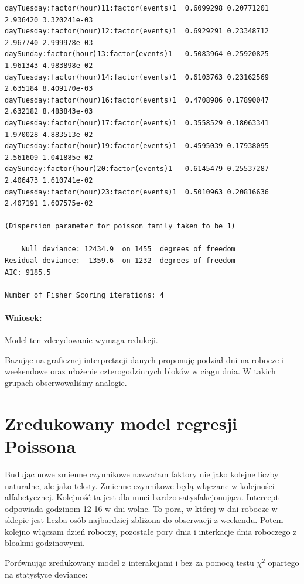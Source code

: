 \documentclass[a4paper,11pt]{article}
\begin{document}
\begin{verbatim}
dayTuesday:factor(hour)11:factor(events)1  0.6099298 0.20771201  2.936420 3.320241e-03
dayTuesday:factor(hour)12:factor(events)1  0.6929291 0.23348712  2.967740 2.999978e-03
daySunday:factor(hour)13:factor(events)1   0.5083964 0.25920825  1.961343 4.983898e-02
dayTuesday:factor(hour)14:factor(events)1  0.6103763 0.23162569  2.635184 8.409170e-03
dayTuesday:factor(hour)16:factor(events)1  0.4708986 0.17890047  2.632182 8.483843e-03
dayTuesday:factor(hour)17:factor(events)1  0.3558529 0.18063341  1.970028 4.883513e-02
dayTuesday:factor(hour)19:factor(events)1  0.4595039 0.17938095  2.561609 1.041885e-02
daySunday:factor(hour)20:factor(events)1   0.6145479 0.25537287  2.406473 1.610741e-02
dayTuesday:factor(hour)23:factor(events)1  0.5010963 0.20816636  2.407191 1.607575e-02

(Dispersion parameter for poisson family taken to be 1)

    Null deviance: 12434.9  on 1455  degrees of freedom
Residual deviance:  1359.6  on 1232  degrees of freedom
AIC: 9185.5

Number of Fisher Scoring iterations: 4

\end{verbatim}

\paragraph{Wniosek:}

Model ten zdecydowanie wymaga redukcji. 

Bazując na graficznej interpretacji danych proponuję podział dni na robocze i weekendowe oraz ułożenie czterogodzinnych bloków w ciągu dnia. W takich grupach obserwowaliśmy analogie. 

\section{Zredukowany model regresji Poissona}

Budując nowe zmienne czynnikowe nazwałam faktory nie jako kolejne liczby naturalne,  ale  jako teksty. Zmienne czynnikowe będą włączane w kolejności alfabetycznej. Kolejność ta jest dla mnei bardzo satysfakcjonująca. Intercept odpowiada godzinom 12-16 w dni wolne. To pora, w której w dni robocze w sklepie jest liczba osób najbardziej zbliżona do obserwacji z weekendu. Potem kolejno włączam dzień roboczy, pozostałe pory dnia i interkacje dnia roboczego z bloakmi godzinowymi. 

Porównując zredukowany model z interakcjami i bez za pomocą testu $\chi^{2}$ opartego na statystyce deviance:
\end{document}
